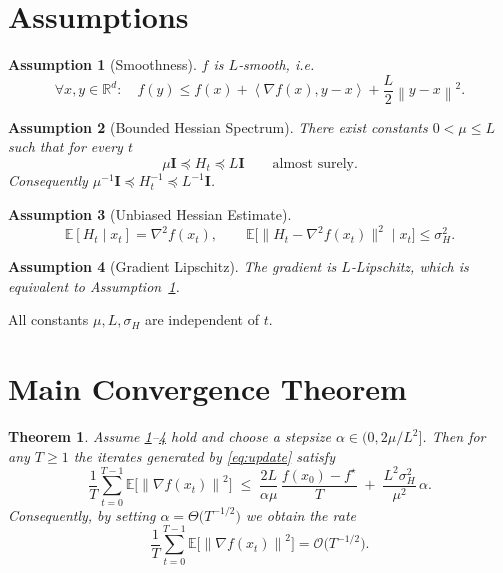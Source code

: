 \documentclass{article}
\newtheorem{theorem}{Theorem}
\newtheorem{assumption}{Assumption}
\newcommand{\E}{\mathbb{E}}
\newcommand{\norm}[1]{\left\|#1\right\|}
\newcommand{\ip}[2]{\left\langle #1,#2\right\rangle}
\newcommand{\Id}{\mathbf{I}}
\begin{document}
\newpage
\section*{Assumptions}
\begin{assumption}[Smoothness]\label{ass:smooth}
$f$ is $L$‑smooth, i.e.
\[
\forall x,y\in\mathbb{R}^d:\quad 
f(y)\le f(x)+\ip{\nabla f(x)}{y-x}+\frac{L}{2}\norm{y-x}^2 .
\]
\end{assumption}
\begin{assumption}[Bounded Hessian Spectrum]\label{ass:eig}
There exist constants $0<\mu\le L$ such that for every $t$
\[
\mu\Id \preceq H_t \preceq L\Id\qquad\text{almost surely.}
\]
Consequently $\mu^{-1}\Id \preceq H_t^{-1}\preceq L^{-1}\Id$.
\end{assumption}
\begin{assumption}[Unbiased Hessian Estimate]\label{ass:unbiased}
\[
\E[H_t\mid x_t]=\nabla^2 f(x_t),\qquad 
\E\big[\|H_t-\nabla^2 f(x_t)\|^2\mid x_t\big]\le\sigma_H^2 .
\]
\end{assumption}
\begin{assumption}[Gradient Lipschitz]\label{ass:gradlip}
The gradient is $L$‑Lipschitz, which is equivalent to Assumption~\ref{ass:smooth}.
\end{assumption}
All constants $\mu,L,\sigma_H$ are independent of $t$.

\section*{Main Convergence Theorem}
\begin{theorem}\label{thm:main}
Assume \ref{ass:smooth}–\ref{ass:gradlip} hold and choose a stepsize 
$\alpha\in(0,2\mu/L^2]$. Then for any $T\ge 1$ the iterates generated by 
\eqref{eq:update} satisfy
\[
\frac{1}{T}\sum_{t=0}^{T-1}\E\!\big[\norm{\nabla f(x_t)}^2\big]
\;\le\;
\frac{2L}{\alpha\mu}\,\frac{f(x_0)-f^\star}{T}
\;+\;
\frac{L^2\sigma_H^2}{\mu^2}\,\alpha .
\tag{1}
\]
Consequently, by setting $\alpha = \Theta\!\big(T^{-1/2}\big)$ we obtain the
rate
\[
\frac{1}{T}\sum_{t=0}^{T-1}\E\!\big[\norm{\nabla f(x_t)}^2\big]=
\mathcal{O}\!\big(T^{-1/2}\big) .
\]
\end{theorem}
\end{document}
